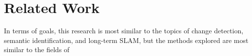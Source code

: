 \section{Related Work}
\label{sec:related_work}

In terms of goals, this research is most similar to the topics of change detection, semantic identification, and long-term SLAM, but the methods explored are most similar to the fields of 

% 